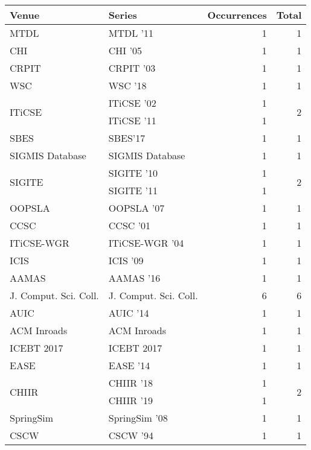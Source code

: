 \begin{table*}[t]
\begin{tabular}{llrr}
Venue & Series & Occurrences & Total\\\hline
\multirow{1}{*}{MTDL } & MTDL '11 & 1 & \multirow{1}{*}{1}\\
\multirow{1}{*}{CHI } & CHI '05 & 1 & \multirow{1}{*}{1}\\
\multirow{1}{*}{CRPIT } & CRPIT '03 & 1 & \multirow{1}{*}{1}\\
\multirow{1}{*}{WSC } & WSC '18 & 1 & \multirow{1}{*}{1}\\
\multirow{2}{*}{ITiCSE } & ITiCSE '02 & 1 & \multirow{2}{*}{2}\\
& ITiCSE '11 & 1 &\\
\multirow{1}{*}{SBES} & SBES'17 & 1 & \multirow{1}{*}{1}\\
\multirow{1}{*}{SIGMIS Database} & SIGMIS Database & 1 & \multirow{1}{*}{1}\\
\multirow{2}{*}{SIGITE } & SIGITE '10 & 1 & \multirow{2}{*}{2}\\
& SIGITE '11 & 1 &\\
\multirow{1}{*}{OOPSLA } & OOPSLA '07 & 1 & \multirow{1}{*}{1}\\
\multirow{1}{*}{CCSC } & CCSC '01 & 1 & \multirow{1}{*}{1}\\
\multirow{1}{*}{ITiCSE-WGR } & ITiCSE-WGR '04 & 1 & \multirow{1}{*}{1}\\
\multirow{1}{*}{ICIS } & ICIS '09 & 1 & \multirow{1}{*}{1}\\
\multirow{1}{*}{AAMAS } & AAMAS '16 & 1 & \multirow{1}{*}{1}\\
\multirow{1}{*}{J. Comput. Sci. Coll.} & J. Comput. Sci. Coll. & 6 & \multirow{1}{*}{6}\\
\multirow{1}{*}{AUIC } & AUIC '14 & 1 & \multirow{1}{*}{1}\\
\multirow{1}{*}{ACM Inroads} & ACM Inroads & 1 & \multirow{1}{*}{1}\\
\multirow{1}{*}{ICEBT 2017} & ICEBT 2017 & 1 & \multirow{1}{*}{1}\\
\multirow{1}{*}{EASE } & EASE '14 & 1 & \multirow{1}{*}{1}\\
\multirow{2}{*}{CHIIR } & CHIIR '18 & 1 & \multirow{2}{*}{2}\\
& CHIIR '19 & 1 &\\
\multirow{1}{*}{SpringSim } & SpringSim '08 & 1 & \multirow{1}{*}{1}\\
\multirow{1}{*}{CSCW } & CSCW '94 & 1 & \multirow{1}{*}{1}\\

\end{tabular}
\end{table*}

